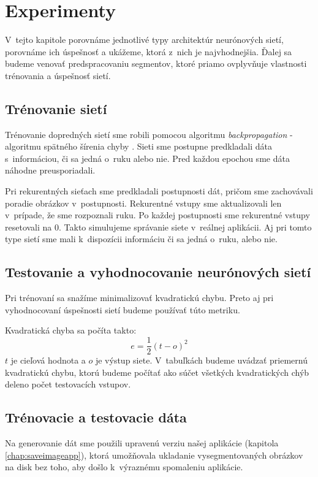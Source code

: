 \chapter{Experimenty}
\label{chap:experiments}

V~tejto kapitole porovnáme jednotlivé typy architektúr neurónových sietí, porovnáme ich úspešnosť a ukážeme, ktorá z~nich je najvhodnejšia. Ďalej sa budeme venovať predspracovaniu segmentov, ktoré priamo ovplyvňuje vlastnosti trénovania a úspešnosť sietí.
\bigskip

\section{Trénovanie sietí}

Trénovanie dopredných sietí sme robili pomocou algoritmu \textit{backpropagation} - algoritmu spätného šírenia chyby \cite{haykin1999neural}. Sieti sme postupne predkladali dáta s~informáciou, či sa jedná o~ruku alebo nie. Pred každou epochou sme dáta náhodne preusporiadali. 

Pri rekurentných sieťach sme predkladali postupnosti dát, pričom sme zachovávali poradie obrázkov v~postupnosti. Rekurentné vstupy sme aktualizovali len v~prípade, že sme rozpoznali ruku. Po každej postupnosti sme rekurentné vstupy resetovali na 0. Takto simulujeme správanie siete v~reálnej aplikácii. Aj pri tomto type sietí sme mali k~dispozícii informáciu či sa jedná o~ruku, alebo nie.

\section{Testovanie a vyhodnocovanie neurónových sietí}
Pri trénovaní sa snažíme minimalizovať kvadratickú chybu. Preto aj pri vyhodnocovaní úspešnosti sietí budeme používať túto metriku.

Kvadratická chyba sa počíta takto: $$e = \frac{1}{2}(t-o)^2$$
$t$ je cieľová hodnota a $o$ je výstup siete. V~tabuľkách budeme uvádzať priemernú kvadratickú chybu, ktorú budeme počítať ako súčet všetkých kvadratických chýb deleno počet testovacích vstupov. 

\section{Trénovacie a testovacie dáta}
\label{chap:data}

Na generovanie dát sme použili upravenú verziu našej aplikácie (kapitola \ref{chap:saveimageapp}), ktorá umožňovala ukladanie vysegmentovaných obrázkov na disk bez toho, aby došlo k~výraznému spomaleniu aplikácie. 

